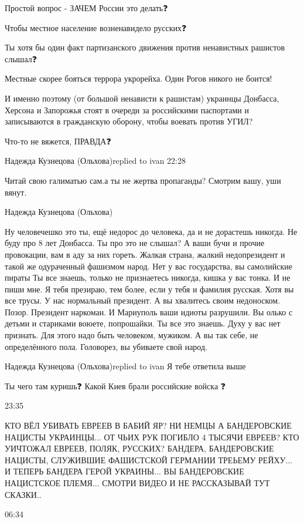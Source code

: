 Простой вопрос - ЗАЧЕМ России это делать❓

Чтобы местное население возненавидело русских❓

Ты хотя бы один факт  партизанского движения против ненавистных  рашистов слышал❓

Местные скорее бояться террора укрорейха. Один Рогов никого не боится! 

И именно поэтому (от большой ненависти к рашистам) украинцы Донбасса, Херсона и
Запорожья стоят в очереди за российскими паспортами и записываются в
гражданскую оборону, чтобы воевать против УГИЛ? 

Что-то не вяжется, ПРАВДА❓

Надежда Кузнецова (Ольхова)replied to ivan
22:28

Читай свою галиматью сам.а ты не жертва пропаганды? Смотрим вашу, уши вянут.

Надежда Кузнецова (Ольхова)

Ну человечешко это ты, ещё недорос до человека, да и не дорастешь никогда. Не
буду про 8 лет Донбасса. Ты про это не слышал? А ваши бучи и прочие провокации,
вам в аду за них гореть. Жалкая страна, жалкий недопрезидент и такой же
одураченный фашизмом народ. Нет у вас государства, вы самолийские пираты Ты все
знаешь, только не признаетесь никогда, кишка у вас тонка. И не пиши мне. Я тебя
презираю, тем более, если у тебя и фамилия русская. Хотя вы все трусы. У нас
нормальный президент. А вы хвалитесь своим недоноском. Позор. Президент
наркоман. И Мариуполь ваши идиоты разрушили. Вы олько с детьми и стариками
воюете, попрошайки. Ты все это знаешь. Духу у вас нет признать. Для этого надо
быть человеком, мужиком. А вы так себе, не определённого пола. Головорез, вы
убиваете свой народ.

Надежда Кузнецова (Ольхова)replied to ivan
Я тебе ответила выше🤮

Ты чего там куришь❓
Какой Киев брали российские войска ❓

23:35

КТО ВЁЛ УБИВАТЬ ЕВРЕЕВ В БАБИЙ ЯР? НИ НЕМЦЫ А БАНДЕРОВСКИЕ НАЦИСТЫ УКРАИНЦЫ...
ОТ ЧЬИХ РУК ПОГИБЛО 4 ТЫСЯЧИ ЕВРЕЕВ? КТО УИЧТОЖАЛ ЕВРЕЕВ, ПОЛЯК, РУССКИХ?
БАНДЕРА, БАНДЕРОВСКИЕ НАЦИСТЫ, СЛУЖИВШИЕ ФАШИСТСКОЙ ГЕРМАНИИ ТРЕЬЕМУ РЕЙХУ... И
ТЕПЕРЬ БАНДЕРА ГЕРОЙ УКРАИНЫ... ВЫ БАНДЕРОВСКИЕ НАЦИСТСКОЕ ПЛЕМЯ... СМОТРИ
ВИДЕО И НЕ РАССКАЗЫВАЙ ТУТ СКАЗКИ..

06:34

